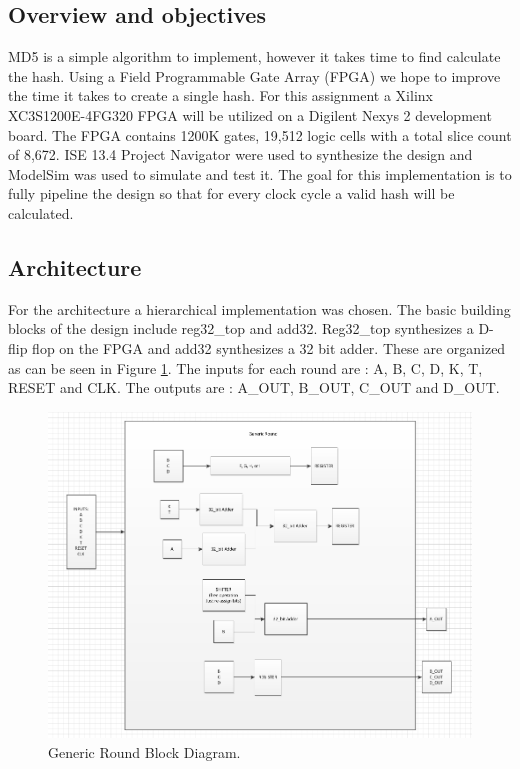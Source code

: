 
	\subsection{Overview and objectives}
	
	MD5 is a simple algorithm to implement, however it takes time to find calculate the hash.  Using a Field Programmable Gate Array (FPGA) we hope to improve the time it takes to create a single hash.  For this assignment a Xilinx XC3S1200E-4FG320 FPGA will be utilized on a Digilent Nexys 2 development board.  The FPGA contains 1200K gates, 19,512 logic cells with a total slice count of 8,672.  ISE 13.4 Project Navigator were used to synthesize the design and ModelSim was used to simulate and test it.  The goal for this implementation is to fully pipeline the design so that for every clock cycle a valid hash will be calculated.

	\subsection{Architecture}
		For the architecture a hierarchical implementation was chosen.  The basic building blocks of the design include reg32\_top and add32.  Reg32\_top synthesizes a D-flip flop on the FPGA and add32 synthesizes a 32 bit adder.  These are organized as can be seen in Figure \ref{fig:Round}.  The inputs for each round are : A, B, C, D, K, T, RESET and CLK.  The outputs are : A\_OUT, B\_OUT, C\_OUT and D\_OUT.
\begin{figure}[h]
\centering
\includegraphics[width=0.7\linewidth]{./Round}
\caption{Generic Round Block Diagram.}
\label{fig:Round}
\end{figure}

